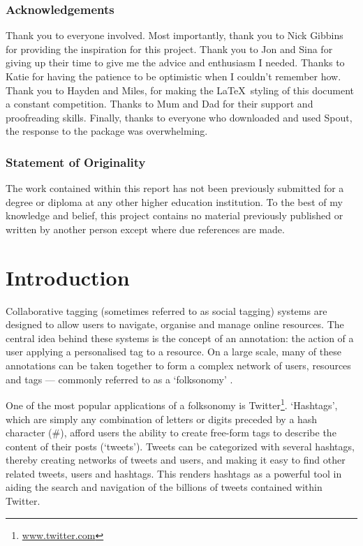 \documentclass[11pt,a4paper]{report}
\begin{document}
\tableofcontents

\pagebreak

\subsection*{Acknowledgements}
Thank you to everyone involved. Most importantly, thank you to Nick Gibbins for providing the inspiration for this project. Thank you to Jon and Sina for giving up their time to give me the advice and enthusiasm I needed. Thanks to Katie for having the patience to be optimistic when I couldn't remember how. Thank you to Hayden and Miles, for making the \LaTeX\ styling of this document a constant competition. Thanks to Mum and Dad for their support and proofreading skills. Finally, thanks to everyone who downloaded and used Spout, the response to the package was overwhelming.

\subsection*{Statement of Originality}

The work contained within this report has not been previously submitted for a degree or diploma at any other higher education institution. To the best of my knowledge and belief, this project contains no material previously published or written by another person except where due references are made.

\pagebreak

\setcounter{page}{1}

\chapter{Introduction}
\label{chap:introduction}
Collaborative tagging (sometimes referred to as social tagging) systems are designed to allow users to navigate, organise and manage online resources. The central idea behind these systems is the concept of an annotation: the action of a user applying a personalised tag to a resource. On a large scale, many of these annotations can be taken together to form a complex network of users, resources and tags --- commonly referred to as a `folksonomy' \parencite{Xu:2008}.

One of the most popular applications of a folksonomy is Twitter\footnote{\url{www.twitter.com}}. `Hashtags', which are simply any combination of letters or digits preceded by a hash character (\#), afford users the ability to create free-form tags to describe the content of their posts (`tweets'). Tweets can be categorized with several hashtags, thereby creating networks of tweets and users, and making it easy to find other related tweets, users and hashtags. This renders hashtags as a powerful tool in aiding the search and navigation of the billions of tweets contained within Twitter.
\end{document}
